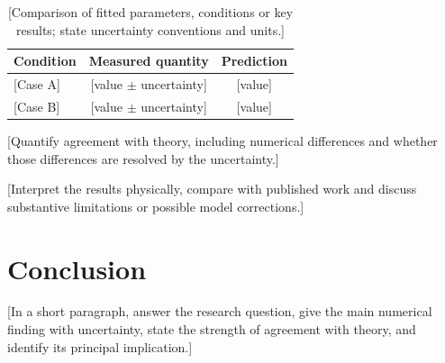 \documentclass[
 reprint,
 amsmath,amssymb,
 aps,
]{revtex4-2}
\begin{document}
\begin{table}[htbp]
\caption{[Comparison of fitted parameters, conditions or key results;
state uncertainty conventions and units.]}
\label{tab:results}
\begin{ruledtabular}
\begin{tabular}{lcc}
Condition & Measured quantity & Prediction \\
\hline
{[Case A]} & [value $\pm$ uncertainty] & [value] \\
{[Case B]} & [value $\pm$ uncertainty] & [value] \\
\end{tabular}
\end{ruledtabular}
\end{table}

[Quantify agreement with theory, including numerical differences and
whether those differences are resolved by the uncertainty.]

[Interpret the results physically, compare with published work and
discuss substantive limitations or possible model corrections.]

\section{Conclusion}
\label{sec:conclusion}

[In a short paragraph, answer the research question, give the main
numerical finding with uncertainty, state the strength of agreement
with theory, and identify its principal implication.]


\end{document}
